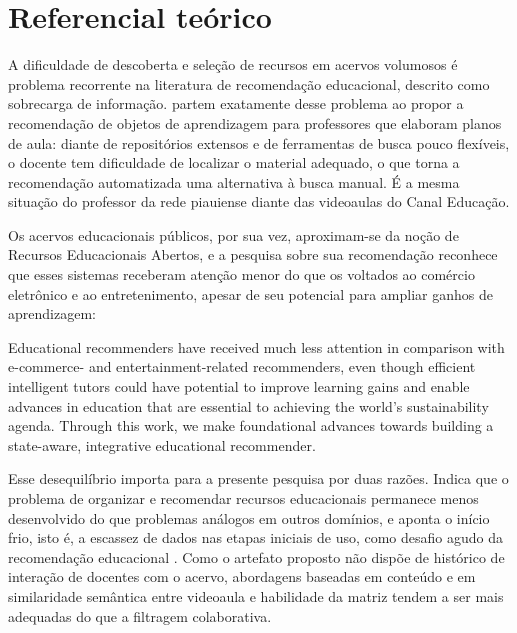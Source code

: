 
\section{Referencial teórico}

A dificuldade de descoberta e seleção de recursos em acervos volumosos é
problema recorrente na literatura de recomendação educacional, descrito como
sobrecarga de informação.  partem exatamente desse
problema ao propor a recomendação de objetos de aprendizagem para professores
que elaboram planos de aula: diante de repositórios extensos e de ferramentas
de busca pouco flexíveis, o docente tem dificuldade de localizar o material
adequado, o que torna a recomendação automatizada uma alternativa à busca
manual. É a mesma situação do professor da rede piauiense diante das videoaulas
do Canal Educação.

Os acervos educacionais públicos, por sua vez, aproximam-se da noção de
Recursos Educacionais Abertos, e a pesquisa sobre sua recomendação reconhece
que esses sistemas receberam atenção menor do que os voltados ao comércio
eletrônico e ao entretenimento, apesar de seu potencial para ampliar ganhos de
aprendizagem:

\begin{citacao}
Educational recommenders have received much less attention in comparison with
e-commerce- and entertainment-related recommenders, even though efficient
intelligent tutors could have potential to improve learning gains and enable
advances in education that are essential to achieving the world's
sustainability agenda. Through this work, we make foundational advances towards
building a state-aware, integrative educational recommender.
\parencite[p.~1]{bulathwela2022}
\end{citacao}

Esse desequilíbrio importa para a presente pesquisa por duas razões. Indica que
o problema de organizar e recomendar recursos educacionais permanece menos
desenvolvido do que problemas análogos em outros domínios, e aponta o início
frio, isto é, a escassez de dados nas etapas iniciais de uso, como desafio
agudo da recomendação educacional \parencite{bulathwela2022}. Como o artefato
proposto não dispõe de histórico de interação de docentes com o acervo,
abordagens baseadas em conteúdo e em similaridade semântica entre videoaula e
habilidade da matriz tendem a ser mais adequadas do que a filtragem
colaborativa.

